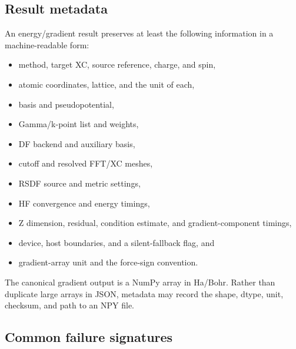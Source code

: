 \subsection{Result metadata}

An energy/gradient result preserves at least the following information in a
machine-readable form:
\begin{itemize}
  \item method, target XC, source reference, charge, and spin,
  \item atomic coordinates, lattice, and the unit of each,
  \item basis and pseudopotential,
  \item Gamma/k-point list and weights,
  \item DF backend and auxiliary basis,
  \item cutoff and resolved FFT/XC meshes,
  \item RSDF source and metric settings,
  \item HF convergence and energy timings,
  \item Z dimension, residual, condition estimate, and gradient-component
        timings,
  \item device, host boundaries, and a silent-fallback flag, and
  \item gradient-array unit and the force-sign convention.
\end{itemize}

The canonical gradient output is a NumPy array in Ha/Bohr.  Rather than
duplicate large arrays in JSON, metadata may record the shape, dtype, unit,
checksum, and path to an NPY file.

\subsection{Common failure signatures}

